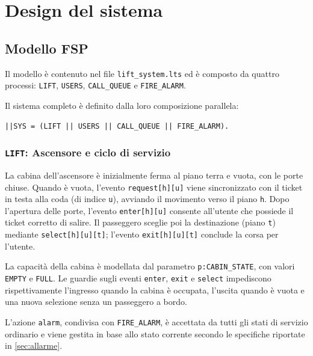 \chapter{Design del sistema}

%
%
\section{Modello FSP}
Il modello è contenuto nel file \texttt{lift\_system.lts} ed è composto da quattro processi: \texttt{LIFT}, \texttt{USERS}, \texttt{CALL\_QUEUE} e \texttt{FIRE\_ALARM}.

Il sistema completo è definito dalla loro composizione parallela:
\begin{center}
  \texttt{||SYS = (LIFT || USERS || CALL\_QUEUE || FIRE\_ALARM).}
\end{center}

\subsection{\texttt{LIFT}: Ascensore e ciclo di servizio}
La cabina dell'ascensore è inizialmente ferma al piano terra e vuota, con le porte chiuse.
Quando è vuota, l'evento \texttt{request[h][u]} viene sincronizzato con il ticket in testa alla coda (di indice \texttt{u}), avviando il movimento verso il piano \texttt{h}.
Dopo l'apertura delle porte, l'evento \texttt{enter[h][u]} consente all'utente che possiede il ticket corretto di salire.
Il passeggero sceglie poi la destinazione (piano \texttt{t}) mediante \texttt{select[h][u][t]}; l'evento \texttt{exit[h][u][t]} conclude la corsa per l'utente.

La capacità della cabina è modellata dal parametro \texttt{p:CABIN\_STATE}, con valori \texttt{EMPTY} e \texttt{FULL}.
Le guardie sugli eventi \texttt{enter}, \texttt{exit} e \texttt{select} impediscono rispettivamente l'ingresso quando la cabina è occupata, l'uscita quando è vuota e una nuova selezione senza un passeggero a bordo.

L'azione \texttt{alarm}, condivisa con \texttt{FIRE\_ALARM}, è accettata da tutti gli stati di servizio ordinario e viene gestita in base allo stato corrente secondo le specifiche riportate in \cref{sec:allarme}.

